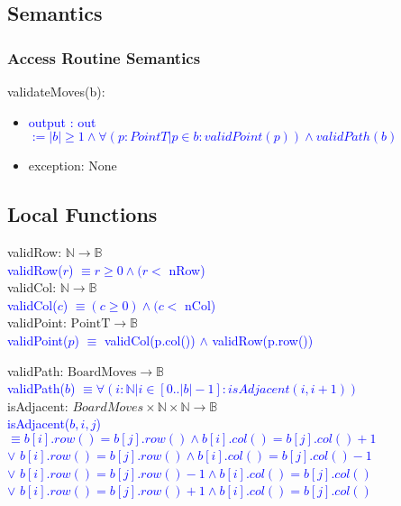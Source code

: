 \documentclass[12pt]{article}
\begin{document}
\subsection* {Semantics}

\subsubsection* {Access Routine Semantics}

\noindent validateMoves(b): 
\begin{itemize}
\item \textcolor{blue}{output : out $:= |b| \geq 1 \land \forall(p : PointT | p \in b : validPoint(p)) \land validPath(b) $}
\item exception: None
\end{itemize}

\subsection*{Local Functions}

\noindent validRow: $\mathbb{N} \rightarrow \mathbb{B}$\\
\noindent \textcolor{blue}{validRow($r$) $\equiv r \geq 0 \land (r < $ nRow)} \\

\noindent validCol: $\mathbb{N} \rightarrow \mathbb{B}$\\
\noindent \textcolor{blue}{validCol($c$) $\equiv (c \geq 0) \land (c < $ nCol)} \\


\noindent validPoint: $\mbox{PointT} \rightarrow \mathbb{B}$\\
\noindent \textcolor{blue}{validPoint($p$) $\equiv$ validCol(p.col()) $\land$ validRow(p.row())}

\noindent validPath: $\mbox{BoardMoves} \rightarrow \mathbb{B}$\\
\noindent \textcolor{blue}{validPath($b$) $\equiv \forall(i : \mathbb{N} | i \in [0..|b|-1] : isAdjacent(i,i+1) )$}\\
 
\noindent isAdjacent: $ BoardMoves \times \mathbb{N} \times \mathbb{N} \rightarrow \mathbb{B}$\\
\noindent \textcolor{blue}{isAdjacent($b,i,j$) $\equiv b[i].row() = b[j].row() \land b[i].col() = b[j].col() + 1$\\
$\lor$  $b[i].row() = b[j].row() \land b[i].col() = b[j].col() - 1$\\
$\lor$  $b[i].row() = b[j].row() - 1 \land b[i].col() = b[j].col()$\\
$\lor$  $b[i].row() = b[j].row() + 1 \land b[i].col() = b[j].col()$ }\\
\end{document}
